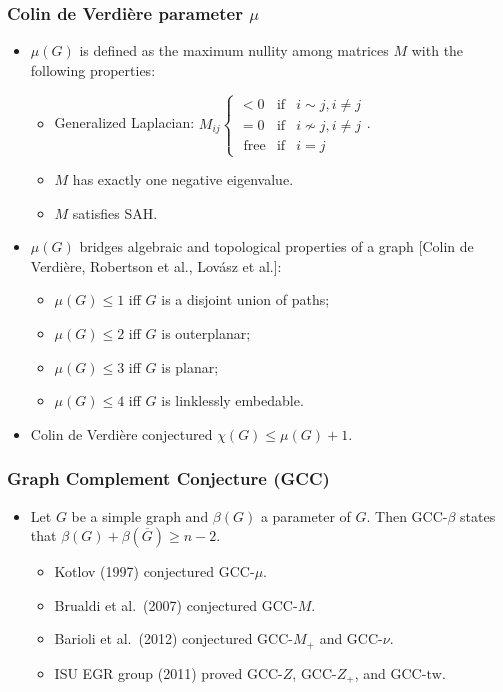 \documentclass{beamer}
\begin{document}
\begin{frame}
\frametitle{Colin de Verdi\`ere parameter $\mu$}
\begin{itemize}
\item $\mu(G)$ is defined as the maximum nullity among matrices $M$ with the following properties:
\begin{itemize}
\item {\color{green} Generalized Laplacian}: $M_{ij}\left\{\begin{array}{lll} < 0 &\text{if}& i\sim j,i\neq j\\ =0 & \text{if} & i\nsim j, i\neq j \\ \text{ free} & \text{if} & i=j \end{array}\right.$.
\item $M$ has exactly {\color{blue} one negative eigenvalue}.
\item $M$ satisfies {\color{red} SAH}.
\end{itemize}
\item $\mu(G)$ bridges \alert{algebraic} and \alert{topological} properties of a graph [Colin de Verdi\`ere, Robertson et al., Lov\'asz et al.\nocite{CdV, RST93, LSch98}]:
\begin{itemize}
\item $\mu(G)\leq 1$ iff $G$ is a disjoint union of paths;
\item $\mu(G)\leq 2$ iff $G$ is outerplanar;
\item $\mu(G)\leq 3$ iff $G$ is planar;
\item $\mu(G)\leq 4$ iff $G$ is linklessly embedable.
\end{itemize}
\item Colin de Verdi\`ere\nocite{CdV} conjectured $\chi(G)\leq \mu(G)+1$.
\end{itemize}
\end{frame}


\begin{frame}
\frametitle{Graph Complement Conjecture (GCC)}
\begin{itemize}
\item Let $G$ be a simple graph and $\beta(G)$ a parameter of $G$. Then GCC-$\beta$ states that $\beta(G)+\beta(\overline{G})\geq n-2$.
\begin{itemize}
\item Kotlov (1997)\nocite{KLV} conjectured GCC-$\mu$.
\item Brualdi et al.~(2007)\nocite{AIMrpt} conjectured GCC-$M$.
\item Barioli et al.~(2012)\nocite{GCC} conjectured GCC-$M_+$ and GCC-$\nu$.
\item ISU EGR group (2011)\nocite{EGR11} proved GCC-$Z$, GCC-$Z_+$, and GCC-$\text{tw}$.
\end{itemize}
\end{itemize}
\end{frame}
\end{document}
